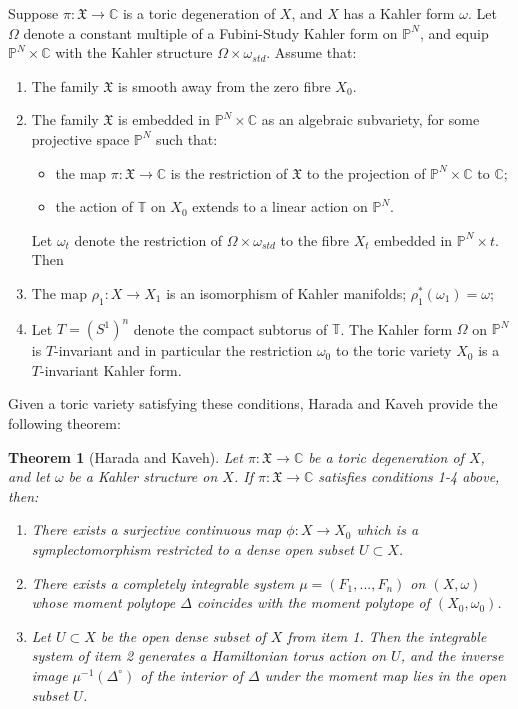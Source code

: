 \documentclass[]{article}
\newtheorem{theorem}{Theorem}
\newcommand{\C}{\mathbb{C}}
\newcommand{\XX}{\mathfrak{X}}
\begin{document}
	Suppose $\pi:\XX\to\C$ is a toric degeneration of $X$, and $X$ has a Kahler form $\omega$. Let $\Omega$ denote a constant multiple of a Fubini-Study Kahler form on $\mathbb{P}^N$, and equip $\mathbb{P}^N\times\C$ with the Kahler structure $\Omega \times \omega_{std}$. Assume that:
	\begin{enumerate}
		\item The family $\XX$ is smooth away from the zero fibre $X_0$.
		\item The family $\XX$ is embedded in $\mathbb{P}^N\times \C$ as an algebraic subvariety, for some projective space $\mathbb{P}^N$ such that:
		\begin{itemize}
			\item the map $\pi:\XX\to\C$ is the restriction of $\XX$ to the projection of $\mathbb{P}^N\times \C$ to $\C$;
			\item the action of $\mathbb{T}$ on $X_0$ extends to a linear action on $\mathbb{P}^N$.
		\end{itemize}
		Let $\omega_t$ denote the restriction of $\Omega\times \omega_{std}$ to the fibre $X_t$ embedded in $\mathbb{P}^N \times {t}$. Then
		\item The map $\rho_1 : X\to X_1$ is an isomorphism of Kahler manifolds; $\rho_1^\ast(\omega_1) = \omega$;
		\item Let $T = (S^1)^n$ denote the compact subtorus of $\mathbb{T}$. The Kahler form $\Omega$ on $\mathbb{P}^N$ is $T$-invariant and in particular the restriction $\omega_0$ to the toric variety $X_0$ is a $T$-invariant Kahler form.
	\end{enumerate}
	Given a toric variety satisfying these conditions, Harada and Kaveh provide the following theorem:
	\begin{theorem}[Harada and Kaveh]
		\label{t:haradakaveh}
		Let $\pi:\XX\to \C$ be a toric degeneration of $X$, and let $\omega$ be a Kahler structure on $X$. If $\pi:\XX\to\C$ satisfies conditions 1-4 above, then:
		\begin{enumerate}
			\item There exists a surjective continuous map $\phi:X\to X_0$ which is a symplectomorphism restricted to a dense open subset $U\subset X$.
			\item There exists a completely integrable system $\mu = (F_1,...,F_n)$ on $(X,\omega)$ whose moment polytope $\Delta$ coincides with the moment polytope of $(X_0, \omega_0)$.
			\item Let $U\subset X$ be the open dense subset of $X$ from item 1. Then the integrable system of item 2 generates a Hamiltonian torus action on $U$, and the inverse image $\mu^{-1}(\Delta^\circ)$ of the interior of $\Delta$ under the moment map lies in the open subset $U$.
		\end{enumerate}
	\end{theorem}
\end{document}

